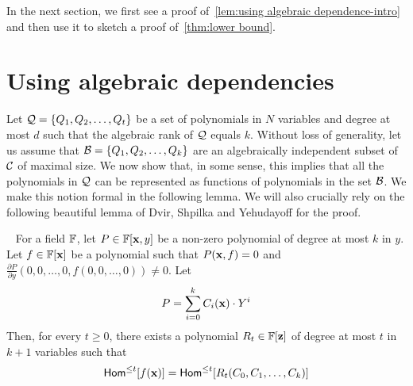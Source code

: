 In the next section, we first see a proof of~\autoref{lem:using algebraic dependence-intro} and then use it to sketch a proof of~\autoref{thm:lower bound}. 

\section{Using algebraic dependencies}
Let ${\cal Q} = \{Q_1, Q_2, \ldots, Q_t\}$ be a set of polynomials in $N$ variables and degree at most $d$ such that the algebraic rank of ${\cal Q}$ equals $k$. Without loss of generality, let us assume that ${\cal B} = \{Q_1, Q_2, \ldots, Q_k\}$ are an algebraically independent subset of $\cal C$ of maximal size. We now show that, in some sense, this implies that all the polynomials in ${\cal Q}$ can be represented as functions of  polynomials in the set ${\cal B}$. We make this notion formal in the following lemma. We will also crucially rely on the following beautiful lemma of Dvir, Shpilka and Yehudayoff for the proof. 

\begin{lemma}~\label{lem:DSY main}
For a field $\mathbb{F}$, let $P \in \mathbb{F}[\mathbf{x}, y]$ be a non-zero polynomial of degree at most $k$ in $y$. Let $f \in \mathbb{F}[\mathbf{x}]$ be a polynomial such that $P(\mathbf{x}, f) = 0$ and $\frac{\partial P}{\partial y} (0, 0, \ldots, 0, f(0, 0, \ldots, 0))\neq 0$. Let $$P = \sum_{i = 0}^k C_i(\mathbf{x})\cdot Y^i$$ Then, for every $t \geq 0$, there exists a polynomial $R_t \in \mathbb{F}[\mathbf{z}]$ of degree at most $t$ in $k+1$ variables such that $$\mathsf{Hom}^{\leq t}[f(\mathbf{x})] = \mathsf{Hom}^{\leq t}[R_t(C_0, C_1, \ldots, C_k)] $$
\end{lemma} 



